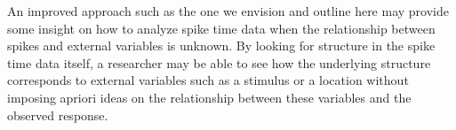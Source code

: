 An improved approach such as the one we envision and outline here  may provide some insight on how to analyze
spike time data when the relationship between spikes and external variables is unknown.  By looking for structure in the 
spike time data itself,  a researcher may be able to see how the underlying structure corresponds to external variables such as a stimulus  or a location without imposing apriori ideas  on the relationship between these variables and the observed response.















%
%
%
